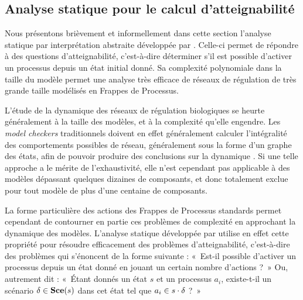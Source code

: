 


\subsection{Analyse statique pour le calcul d'atteignabilité}

Nous présentons brièvement et informellement dans cette section
l'analyse statique par interprétation abstraite
développée par .
Celle-ci permet de répondre à des questions d'atteignabilité,
c'est-à-dire déterminer s'il est possible d'activer un processus depuis un état initial donné.
Sa complexité polynomiale dans la taille du modèle
permet une analyse très efficace de réseaux de régulation de très grande taille
modélisés en Frappes de Processus.

\myskip

L'étude de la dynamique des réseaux de régulation biologiques se heurte généralement
à la taille des modèles, et à la complexité qu'elle engendre.
Les \textit{model checkers} traditionnels doivent en effet généralement calculer
l'intégralité des comportements possibles de réseau,
généralement sous la forme d'un graphe des états,
afin de pouvoir produire des conclusions sur la dynamique \cite{Richard06}.
Si une telle approche a le mérite de l'exhaustivité,
elle n'est cependant pas applicable à des modèles dépassant quelques dizaines de composants,
et donc totalement exclue pour tout modèle de plus d'une centaine de composants.

La forme particulière des actions des Frappes de Processus standards
permet cependant de contourner en partie ces problèmes de complexité en approchant
la dynamique des modèles.
L'analyse statique développée par  utilise en effet
cette propriété pour résoudre efficacement des problèmes d'atteignabilité,
c'est-à-dire des problèmes qui s'énoncent de la forme suivante :
«~Est-il possible d'activer un processus depuis un état donné en jouant
un certain nombre d'actions ?~»
Ou, autrement dit :
«~Étant donnés un état $s$ et un processus $a_i$,
existe-t-il un scénario $\delta \in \mathbf{Sce}(s)$ dans cet état
tel que $a_i \in s \cdot \delta$ ?~»

